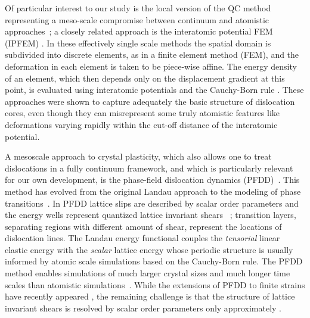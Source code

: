 \documentclass[CRPHYS,Unicode,manuscript]{cedram}
\begin{document}
Of particular interest to  our study is the local version of the QC method representing a meso-scale compromise between  continuum and atomistic approaches~\cite{Tadmor1996-qi,Sorkin2014-jy}; a closely related approach  is  the interatomic potential FEM (IPFEM) \cite{Van_Vliet2003-yg,Zhu2004-wr}.   In these effectively single scale methods  the spatial domain is subdivided into discrete elements, as in a finite element method (FEM), and  the  deformation in each element is taken to be piece-wise affine.  The  energy density  of an element, which then depends only on the displacement gradient at this point,  is  evaluated using  interatomic potentials and the   Cauchy-Born rule \cite{Ericksen2008-kx,Weinan2007-hd,Steinmann2006-qw,Podio-Guidugli2010-hx}. These approaches were shown to capture adequately the basic structure of  dislocation cores,  even though  they can misrepresent  some truly atomistic features like  deformations varying rapidly within the cut-off distance of the interatomic potential. 

A  mesoscale approach to crystal plasticity, which also allows one to treat dislocations in a fully continuum framework,  and which is particularly  relevant for our own development, is the  phase-field dislocation dynamics (PFDD)~\cite{Koslowski2002-dn,Rodney2003-wy,Beyerlein2016-av,Ruffini2017-fs}. This method has evolved from  the original  Landau  approach to the modeling of phase transitions~\cite{Chen2002-cn,salman_thesis,Finel2010-rd,Salman2012-zg,Shchyglo2012-nz,Salman2019-cg}.   In PFDD lattice  slips are described  by scalar order parameters and the energy wells  represent quantized lattice invariant shears ~\cite{Jin2001-fw,Rodney2003-wy,Zheng2018-zn};   transition layers,  separating    regions with different amount of shear,    represent the locations of dislocation lines.  The Landau energy functional couples the  \emph{tensorial} linear elastic    energy with the\emph{ scalar}  lattice energy whose periodic structure  is usually  informed by  atomic scale simulations based on the Cauchy-Born rule.  The PFDD method  enables simulations of much larger crystal sizes and much longer time scales  than  atomistic simulations~\cite{Hu2001-cp,Chen2002-cn,Louchez2017-ui,Qiu2019-ue}. While  the extensions  of PFDD to finite strains have  recently appeared \cite{Biscari2016-qy,Javanbakht2016-dr}, the remaining challenge is that the   structure of lattice invariant shears is  resolved  by scalar order parameters only  approximately  \cite{Xu2019-ex,Li2017-dz,Salvalaglio2020-eb}. 
\end{document}
